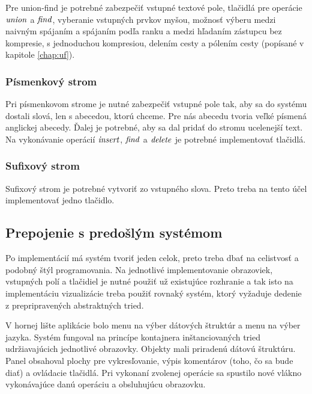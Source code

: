 Pre union-find je potrebné zabezpečiť vstupné textové pole, tlačidlá pre 
operácie $\mathop{\mathit{union}}$ a $\mathop{\mathit{find}}$, vyberanie vstupných prvkov myšou, možnosť výberu 
medzi naivným spájaním a spájaním podľa ranku a medzi hľadaním zástupcu bez 
kompresie, s jednoduchou kompresiou, delením cesty a pólením cesty (popísané 
v kapitole \ref{chap:uf}).

\subsubsection{Písmenkový strom}

Pri písmenkovom strome je nutné zabezpečiť vstupné pole tak, aby sa do systému 
dostali slová, len s abecedou, ktorú chceme. Pre nás abecedu tvoria veľké 
písmená anglickej abecedy. Ďalej je potrebné, aby sa dal pridať do stromu 
ucelenejší text. Na vykonávanie operácií $\mathop{\mathit{insert}}$, $\mathop{\mathit{find}}$ a $\mathop{\mathit{delete}}$ je 
potrebné implementovať tlačidlá.

\subsubsection{Sufixový strom}

Sufixový strom je potrebné vytvoriť zo vstupného slova. Preto treba na tento 
účel implementovať jedno tlačidlo.

\subsection{Prepojenie s predošlým systémom}

Po implementácií má systém tvoriť jeden celok, preto treba dbať na celistvosť 
a podobný štýl programovania. Na jednotlivé implementovanie obrazoviek, 
vstupných polí a tlačidiel je nutné použiť už existujúce rozhranie a tak isto 
na implementáciu vizualizácie treba použiť rovnaký systém, ktorý vyžaduje 
dedenie z prepripravených abstraktných tried.

V hornej lište aplikácie bolo menu na výber dátových štruktúr a menu 
na výber jazyka. Systém fungoval na princípe kontajnera inštanciovaných tried 
udržiavajúcich jednotlivé obrazovky. Objekty mali priradenú dátovú štruktúru. 
Panel obsahoval plochy pre vykresľovanie, výpis komentárov (toho, čo sa bude 
diať) a ovládacie tlačidlá. Pri vykonaní zvolenej operácie sa spustilo nové 
vlákno vykonávajúce danú operáciu a obsluhujúcu obrazovku.

